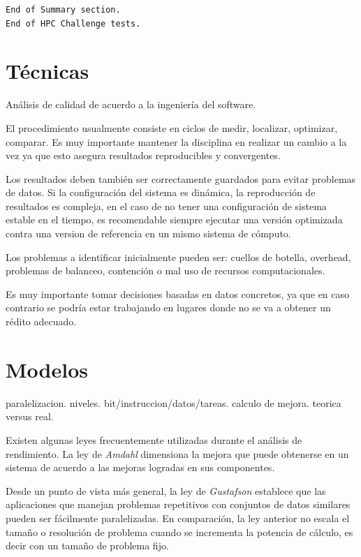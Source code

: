 \documentclass[a4paper]{report}
\begin{document}
\begin{verbatim}
End of Summary section.
End of HPC Challenge tests.
\end{verbatim}

\section{T\'ecnicas}

An\'alisis de calidad de acuerdo a la ingenier\'ia del software.

\bigskip

El procedimiento usualmente consiste en ciclos de medir, localizar, optimizar,
comparar. Es muy importante mantener la disciplina en realizar un cambio a la
vez ya que esto asegura resultados reproducibles y convergentes.

\bigskip

Los resultados deben tambi\'en ser correctamente guardados para evitar
problemas de datos. Si la configuraci\'on del sistema es din\'amica, la reproducci\'on de resultados es compleja, en el caso de no tener una
configuraci\'on de sistema estable en el tiempo, es recomendable siempre
ejecutar una versi\'on optimizada contra una version de referencia en un mismo
sistema de c\'omputo.

\bigskip

Los problemas a identificar inicialmente pueden ser: cuellos de botella,
overhead, problemas de balanceo, contenci\'on o mal uso de recursos
computacionales.

\bigskip

Es muy importante tomar decisiones basadas en datos concretos, ya que en
caso contrario se podr\'ia estar trabajando en lugares donde no se va a obtener
un r\'edito adecuado.

\section{Modelos}

paralelizacion. niveles. bit/instruccion/datos/tareas.
calculo de mejora. teorica versus real. 

\bigskip

Existen algunas leyes frecuentemente utilizadas durante el an\'alisis de
rendimiento. La ley de {\it Amdahl} \cite{amdahl} dimensiona la mejora que
puede obtenerse en un sistema de acuerdo a las mejoras logradas en sus
componentes.

\bigskip

Desde un punto de vista m\'as general, la ley de {\it Gustafson}
\cite{gustafson} establece que las aplicaciones que manejan problemas
repetitivos con conjuntos de datos similares pueden ser f\'acilmente
paralelizadas. En comparaci\'on, la ley anterior no escala el tama\~no o
resoluci\'on de problema cuando se incrementa la potencia de c\'alculo, es
decir con un tama\~no de problema fijo.
\end{document}
